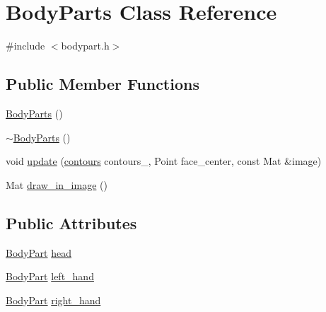 \hypertarget{class_body_parts}{
\section{BodyParts Class Reference}
\label{class_body_parts}
}


{\ttfamily \#include $<$bodypart.h$>$}

\subsection*{Public Member Functions}
\begin{DoxyCompactItemize}
\item 
\hyperlink{class_body_parts_a969d9e3978c48e9aa74e8ee5ae183668}{BodyParts} ()
\item 
\hyperlink{class_body_parts_aff6353ee6d917cca4ff2378f6267e70b}{$\sim$BodyParts} ()
\item 
void \hyperlink{class_body_parts_a28f363a5e8405e60eb21c6304e814a84}{update} (\hyperlink{common_8h_a87a62b74d59a9b4795cc71a10740381e}{contours} contours\_\-, Point face\_\-center, const Mat \&image)
\item 
Mat \hyperlink{class_body_parts_a5e1ba1dcf65841114505359dcbeea512}{draw\_\-in\_\-image} ()
\end{DoxyCompactItemize}
\subsection*{Public Attributes}
\begin{DoxyCompactItemize}
\item 
\hyperlink{class_body_part}{BodyPart} \hyperlink{class_body_parts_a4639c1a935a64333ef1658c1a320f4a7}{head}
\item 
\hyperlink{class_body_part}{BodyPart} \hyperlink{class_body_parts_ad8764fe7847e709d38dab525b83e3825}{left\_\-hand}
\item 
\hyperlink{class_body_part}{BodyPart} \hyperlink{class_body_parts_a92eb5e818287c46c6125872f9e504ad5}{right\_\-hand}
\end{DoxyCompactItemize}


